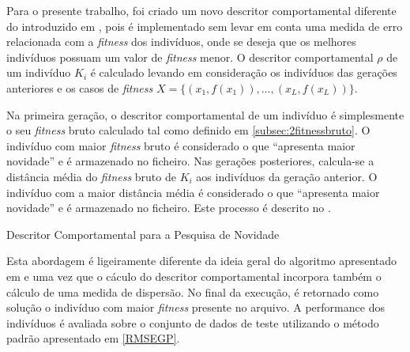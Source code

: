Para o presente trabalho, foi criado um novo descritor comportamental diferente do introduzido em
\citep{Trujillo2013}, pois é implementado sem levar em conta uma medida de erro relacionada com a \emph{fitness} dos indivíduos, onde se deseja
que os melhores indivíduos possuam um valor de \emph{fitness} menor. O descritor comportamental $\rho$ de um indivíduo $K_i$ é calculado 
levando em consideração os indivíduos das gerações anteriores e os casos de \emph{fitness} $X = \{(x_1, f(x_1)), \ldots, (x_L, f(x_L))\}$. 

Na primeira geração, o descritor comportamental de um indivíduo é simplesmente o seu \emph{fitness} bruto calculado tal como definido
em \ref{subsec:2fitnessbruto}. O indivíduo com maior \emph{fitness} bruto é considerado o que ``apresenta maior novidade'' e é armazenado
no ficheiro. Nas gerações posteriores, calcula-se a distância média do \emph{fitness} bruto de $K_i$ aos indivíduos da geração anterior. 
O indivíduo com a maior distância média é considerado o que ``apresenta maior novidade'' e é armazenado no ficheiro. Este processo
é descrito no .

\begin{algorithm}[H]
	\caption{Descritor Comportamental para a Pesquisa de Novidade}
	\label{Algoritmo532}
	\begin{algorithmic}[1]
			\EndFor
		\EndIf
			\EndFor
		\EndFor
	\end{algorithmic}
\end{algorithm}

Esta abordagem é ligeiramente
diferente da ideia geral do algoritmo apresentado em \citep{Lehman2008} e \citep{lehman2010efficiently} uma vez que o cáculo do descritor 
comportamental incorpora também o cálculo de uma medida de dispersão. No final da execução, é retornado como solução o indivíduo com
maior \emph{fitness} presente no arquivo. A performance dos indivíduos é avaliada sobre o conjunto de dados de teste
utilizando o método padrão apresentado em \ref{RMSEGP}.
